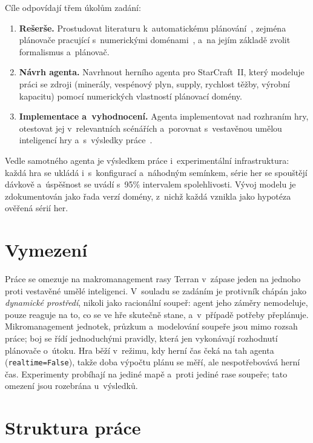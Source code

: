 Cíle odpovídají třem úkolům zadání:

\begin{enumerate}
	\item \textbf{Rešerše.} Prostudovat literaturu k~automatickému plánování~\cite{Ghallab2004}, zejména plánovače pracující s~numerickými doménami~\cite{Gerevini2008}, a~na jejím základě zvolit formalismus a~plánovač.
	\item \textbf{Návrh agenta.} Navrhnout herního agenta pro StarCraft~II, který modeluje práci se zdroji (minerály, vespénový plyn, supply, rychlost těžby, výrobní kapacitu) pomocí numerických vlastností plánovací domény.
	\item \textbf{Implementace a~vyhodnocení.} Agenta implementovat nad rozhraním hry, otestovat jej v~relevantních scénářích a~porovnat s~vestavěnou umělou inteligencí hry a~s~výsledky práce~\cite{Orava2025}.
\end{enumerate}

Vedle samotného agenta je výsledkem práce i~experimentální infrastruktura: každá hra se ukládá i~s~konfigurací a~náhodným semínkem, série her se spouštějí dávkově a~úspěšnost se uvádí s~95\% intervalem spolehlivosti. Vývoj modelu je zdokumentován jako řada verzí domény, z~nichž každá vznikla jako hypotéza ověřená sérií her.

\section*{Vymezení}

Práce se omezuje na makromanagement rasy Terran v~zápase jeden na jednoho proti vestavěné umělé inteligenci. V~souladu se zadáním je protivník chápán jako \emph{dynamické prostředí}, nikoli jako racionální soupeř: agent jeho záměry nemodeluje, pouze reaguje na to, co se ve hře skutečně stane, a~v~případě potřeby přeplánuje. Mikromanagement jednotek, průzkum a~modelování soupeře jsou mimo rozsah práce; boj se řídí jednoduchými pravidly, která jen vykonávají rozhodnutí plánovače o~útoku. Hra běží v~režimu, kdy herní čas čeká na tah agenta (\texttt{realtime=False}), takže doba výpočtu plánu se měří, ale nespotřebovává herní čas. Experimenty probíhají na jediné mapě a~proti jediné rase soupeře; tato omezení jsou rozebrána u~výsledků.

\section*{Struktura práce}

